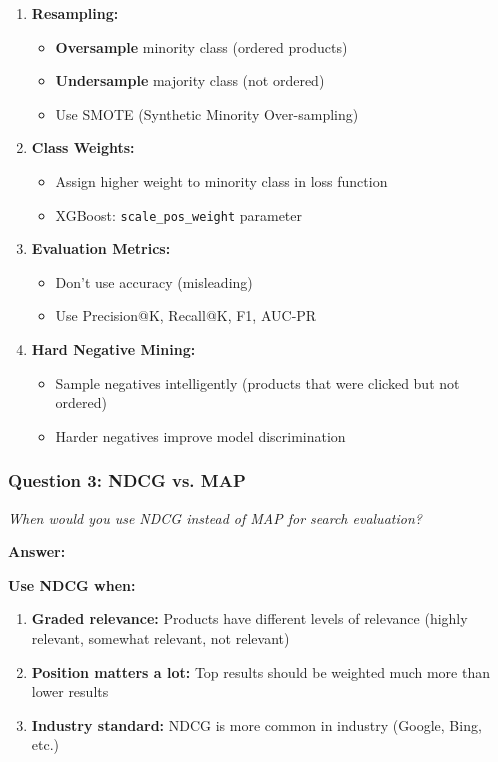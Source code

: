 \documentclass[11pt,letterpaper]{article}
\begin{document}
\begin{enumerate}
    \item \textbf{Resampling:}
    \begin{itemize}
        \item \textbf{Oversample} minority class (ordered products)
        \item \textbf{Undersample} majority class (not ordered)
        \item Use SMOTE (Synthetic Minority Over-sampling)
    \end{itemize}

    \item \textbf{Class Weights:}
    \begin{itemize}
        \item Assign higher weight to minority class in loss function
        \item XGBoost: \texttt{scale\_pos\_weight} parameter
    \end{itemize}

    \item \textbf{Evaluation Metrics:}
    \begin{itemize}
        \item Don't use accuracy (misleading)
        \item Use Precision@K, Recall@K, F1, AUC-PR
    \end{itemize}

    \item \textbf{Hard Negative Mining:}
    \begin{itemize}
        \item Sample negatives intelligently (products that were clicked but not ordered)
        \item Harder negatives improve model discrimination
    \end{itemize}
\end{enumerate}

\subsubsection{Question 3: NDCG vs. MAP}

\textit{When would you use NDCG instead of MAP for search evaluation?}

\textbf{Answer:}

\textbf{Use NDCG when:}
\begin{enumerate}
    \item \textbf{Graded relevance:} Products have different levels of relevance (highly relevant, somewhat relevant, not relevant)
    \item \textbf{Position matters a lot:} Top results should be weighted much more than lower results
    \item \textbf{Industry standard:} NDCG is more common in industry (Google, Bing, etc.)
\end{enumerate}
\end{document}
